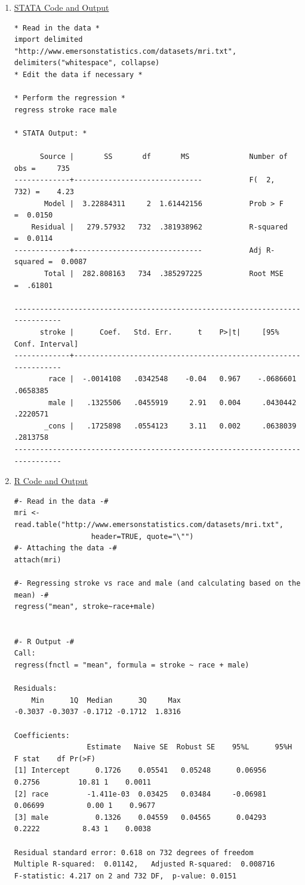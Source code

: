 \documentclass[11pt,letterpaper,fleqn]{report}
\begin{document}
\begin{enumerate}[]
\item \underline{STATA Code and Output}
{\scriptsize
\begin{verbatim}
* Read in the data *
import delimited "http://www.emersonstatistics.com/datasets/mri.txt", delimiters("whitespace", collapse)
* Edit the data if necessary *

* Perform the regression *
regress stroke race male

* STATA Output: *

      Source |       SS       df       MS              Number of obs =     735
-------------+------------------------------           F(  2,   732) =    4.23
       Model |  3.22884311     2  1.61442156           Prob > F      =  0.0150
    Residual |   279.57932   732  .381938962           R-squared     =  0.0114
-------------+------------------------------           Adj R-squared =  0.0087
       Total |  282.808163   734  .385297225           Root MSE      =  .61801

------------------------------------------------------------------------------
      stroke |      Coef.   Std. Err.      t    P>|t|     [95% Conf. Interval]
-------------+----------------------------------------------------------------
        race |  -.0014108   .0342548    -0.04   0.967    -.0686601    .0658385
        male |   .1325506   .0455919     2.91   0.004     .0430442    .2220571
       _cons |   .1725898   .0554123     3.11   0.002     .0638039    .2813758
------------------------------------------------------------------------------

\end{verbatim}}
\item \underline{R Code and Output}
{\scriptsize
\begin{verbatim}
#- Read in the data -#
mri <- read.table("http://www.emersonstatistics.com/datasets/mri.txt", 
                  header=TRUE, quote="\"")
#- Attaching the data -#
attach(mri)

#- Regressing stroke vs race and male (and calculating based on the mean) -#
regress("mean", stroke~race+male)


#- R Output -#
Call:
regress(fnctl = "mean", formula = stroke ~ race + male)

Residuals:
    Min      1Q  Median      3Q     Max 
-0.3037 -0.3037 -0.1712 -0.1712  1.8316 

Coefficients:
                 Estimate   Naive SE  Robust SE    95%L      95%H         F stat    df Pr(>F)   
[1] Intercept      0.1726    0.05541   0.05248      0.06956    0.2756         10.81 1    0.0011 
[2] race         -1.411e-03  0.03425   0.03484     -0.06981   0.06699          0.00 1    0.9677 
[3] male           0.1326    0.04559   0.04565      0.04293    0.2222          8.43 1    0.0038 

Residual standard error: 0.618 on 732 degrees of freedom
Multiple R-squared:  0.01142,	Adjusted R-squared:  0.008716 
F-statistic: 4.217 on 2 and 732 DF,  p-value: 0.0151
\end{verbatim}}
\end{enumerate}
\end{document}

